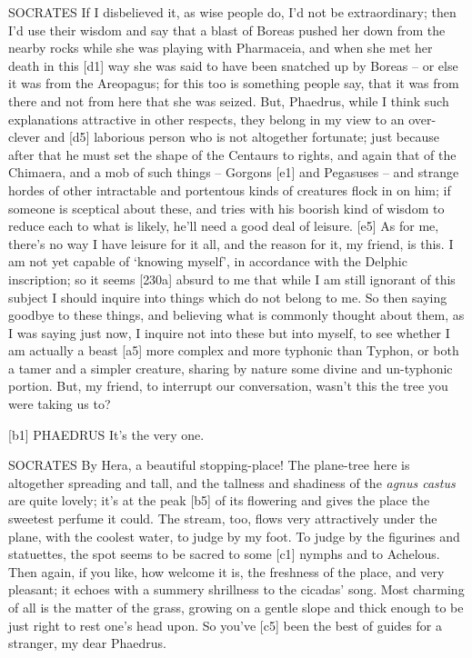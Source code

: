 SOCRATES If I disbelieved it, as wise
people do, I'd not be
extraordinary; then I'd use their wisdom and say that a blast of Boreas
pushed her down from the nearby rocks while she was playing with
Pharmaceia, and when she met her death in this {[}d1{]} way she was said
to have been snatched up by Boreas -- or else it was from the Areopagus;
for this too is something people say, that it was from there and not
from here that she was seized. But, Phaedrus, while I think such
explanations attractive in other respects, they belong in my view to an
over-clever and {[}d5{]} laborious person who is not altogether
fortunate; just because after that he must set the shape of the Centaurs
to rights, and again that of the Chimaera, and a mob of such things --
Gorgons {[}e1{]} and Pegasuses -- and strange hordes of other
intractable and portentous kinds of creatures flock in on him; if
someone is sceptical about these, and tries with his boorish kind of
wisdom to reduce each to what is likely, he'll need a good deal of
leisure. {[}e5{]} As for me, there's no way I have leisure for it all,
and the reason for it, my friend, is this. I am not yet capable of
‘knowing myself', in accordance with the Delphic
inscription; so it seems
{[}230a{]} absurd to me that while I am still ignorant of this subject I
should inquire into things which do not belong to me. So then saying
goodbye to these things, and believing what is commonly thought about
them, as I was saying just now, I inquire not into these but into
myself, to see whether I am actually a beast {[}a5{]} more complex and
more typhonic than
Typhon, or both a tamer
and a simpler creature, sharing by nature some divine and un-typhonic
portion. But, my friend, to interrupt our
conversation, wasn't this
the tree you were taking us to?

{[}b1{]} PHAEDRUS It's the very one.

SOCRATES By Hera, a beautiful
stopping-place! The
plane-tree here is altogether spreading and tall, and the tallness and
shadiness of the {\em agnus
castus} are quite lovely;
it's at the peak {[}b5{]} of its flowering and gives the place the
sweetest perfume it could. The stream, too, flows very attractively
under the plane, with the coolest water, to judge by my foot. To judge
by the figurines and statuettes, the spot seems to be sacred to some
{[}c1{]} nymphs and to
Achelous. Then again, if
you like, how welcome it is, the freshness of the place, and very
pleasant; it echoes with a summery shrillness to the cicadas' song. Most
charming of all is the matter of the grass, growing on a gentle slope
and thick enough to be just right to rest one's head upon. So you've
{[}c5{]} been the best of guides for a stranger, my dear Phaedrus.

